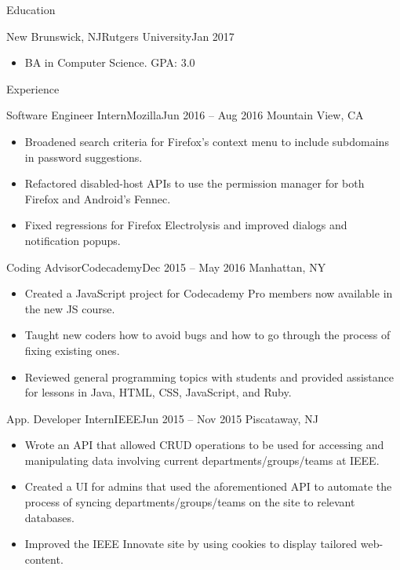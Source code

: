 \documentclass[a4paper]{mcdowellcv}
\begin{document}
	\makeheader
	
	\begin{cvsection}{Education}
		\begin{cvsubsection}{New Brunswick, NJ}{Rutgers University}{Jan 2017}
			\begin{itemize}
				\item BA in Computer Science. GPA: 3.0
			\end{itemize}
		\end{cvsubsection}
	\end{cvsection}
	
	\begin{cvsection}{Experience}
		\begin{cvsubsection}{Software Engineer Intern}{Mozilla}{Jun 2016 -- Aug 2016}
			Mountain View, CA			
			\begin{itemize}
				\item Broadened search criteria for Firefox’s context menu to include subdomains in password suggestions.
				\item Refactored disabled-host APIs to use the permission manager for both Firefox and Android’s Fennec.
				\item Fixed regressions for Firefox Electrolysis and improved dialogs and notification popups.
			\end{itemize}
		\end{cvsubsection}
		
		\begin{cvsubsection}{Coding Advisor}{Codecademy}{Dec 2015 -- May 2016}	
		    Manhattan, NY
			\begin{itemize}
				\item Created a JavaScript project for Codecademy Pro members now available in the new JS course.
				\item Taught new coders how to avoid bugs and how to go through the process of fixing existing ones.
				\item Reviewed general programming topics with students and provided assistance for lessons in Java, HTML, CSS, JavaScript, and Ruby.
			\end{itemize}
		\end{cvsubsection}
		
		\begin{cvsubsection}{App. Developer Intern}{IEEE}{Jun 2015 -- Nov 2015}
		    Piscataway, NJ
			\begin{itemize}
				\item Wrote an API that allowed CRUD operations to be used for accessing and manipulating data involving current departments/groups/teams at IEEE.
				\item Created a UI for admins that used the aforementioned API to automate the process of syncing departments/groups/teams on the site to relevant databases.
				\item Improved the IEEE Innovate site by using cookies to display tailored web-content.
			\end{itemize}
		\end{cvsubsection}
		

\end{cvsection}
\end{document}
